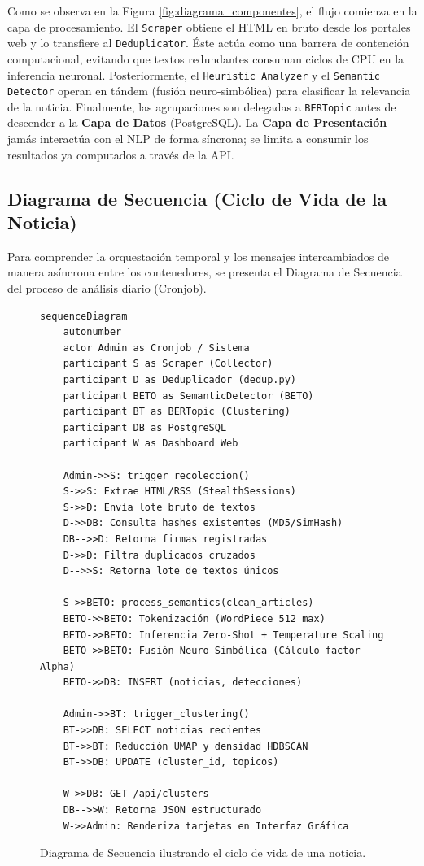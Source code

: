 Como se observa en la Figura \ref{fig:diagrama_componentes}, el flujo comienza en la capa de procesamiento. El \texttt{Scraper} obtiene el HTML en bruto desde los portales web y lo transfiere al \texttt{Deduplicator}. Éste actúa como una barrera de contención computacional, evitando que textos redundantes consuman ciclos de CPU en la inferencia neuronal. Posteriormente, el \texttt{Heuristic Analyzer} y el \texttt{Semantic Detector} operan en tándem (fusión neuro-simbólica) para clasificar la relevancia de la noticia. Finalmente, las agrupaciones son delegadas a \texttt{BERTopic} antes de descender a la \textbf{Capa de Datos} (PostgreSQL). La \textbf{Capa de Presentación} jamás interactúa con el NLP de forma síncrona; se limita a consumir los resultados ya computados a través de la API.

\subsection{Diagrama de Secuencia (Ciclo de Vida de la Noticia)}
\label{subsec:diagrama_secuencia}

Para comprender la orquestación temporal y los mensajes intercambiados de manera asíncrona entre los contenedores, se presenta el Diagrama de Secuencia del proceso de análisis diario (Cronjob).

\begin{figure}[htbp]
    \centering
\begin{verbatim}
sequenceDiagram
    autonumber
    actor Admin as Cronjob / Sistema
    participant S as Scraper (Collector)
    participant D as Deduplicador (dedup.py)
    participant BETO as SemanticDetector (BETO)
    participant BT as BERTopic (Clustering)
    participant DB as PostgreSQL
    participant W as Dashboard Web

    Admin->>S: trigger_recoleccion()
    S->>S: Extrae HTML/RSS (StealthSessions)
    S->>D: Envía lote bruto de textos
    D->>DB: Consulta hashes existentes (MD5/SimHash)
    DB-->>D: Retorna firmas registradas
    D->>D: Filtra duplicados cruzados
    D-->>S: Retorna lote de textos únicos
    
    S->>BETO: process_semantics(clean_articles)
    BETO->>BETO: Tokenización (WordPiece 512 max)
    BETO->>BETO: Inferencia Zero-Shot + Temperature Scaling
    BETO->>BETO: Fusión Neuro-Simbólica (Cálculo factor Alpha)
    BETO->>DB: INSERT (noticias, detecciones)
    
    Admin->>BT: trigger_clustering()
    BT->>DB: SELECT noticias recientes
    BT->>BT: Reducción UMAP y densidad HDBSCAN
    BT->>DB: UPDATE (cluster_id, topicos)
    
    W->>DB: GET /api/clusters
    DB-->>W: Retorna JSON estructurado
    W->>Admin: Renderiza tarjetas en Interfaz Gráfica
\end{verbatim}
    \caption{Diagrama de Secuencia ilustrando el ciclo de vida de una noticia.}
    \label{fig:diagrama_secuencia}
\end{figure}

